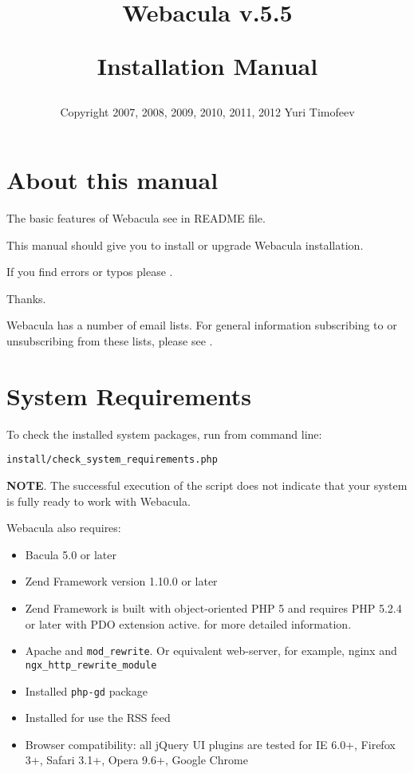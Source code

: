 \documentclass[10pt]{article}
\title{
  \Huge{Webacula v.5.5}
  \begin{center}
   \large{Installation Manual}
  \end{center}
}
\author{
  \begin{small}
    Copyright 2007, 2008, 2009, 2010, 2011, 2012
    Yuri Timofeev \htmladdnormallink{tim4dev@gmail.com}{mailto:tim4dev@gmail.com}
  \end{small}
}
\begin{document}
\maketitle
\clearpage

\tableofcontents
\clearpage

\listoffigures
\clearpage

\section{About this manual}
\label{About}

The basic features of Webacula see in README file.

This manual should give you to install or upgrade Webacula installation.

If you find errors or typos please
.

Thanks.

Webacula has a number of email lists.
For general information subscribing to or unsubscribing from these lists, please see 
.



\section{System Requirements}
\label{System Requirements}

To check the installed system packages, run from command line:
\begin{verbatim}install/check_system_requirements.php\end{verbatim}

\textbf{NOTE}. The successful execution of the script does not indicate that your system is fully ready to work with Webacula.


Webacula also requires:
\begin{itemize}
  \item Bacula 5.0 or later
  \item Zend Framework version 1.10.0 or later
  \item Zend Framework is built with object-oriented PHP 5 and requires PHP 5.2.4 or later with PDO extension active.
        for more detailed information.
  \item Apache and \texttt{mod\_rewrite}. Or equivalent web-server, for example, nginx and \texttt{ngx\_http\_rewrite\_module}
  \item Installed \texttt{php-gd} package
  \item Installed  for use the RSS feed
  \item Browser compatibility: all jQuery UI plugins are tested for IE 6.0+, Firefox 3+, Safari 3.1+, Opera 9.6+, Google Chrome
\end{itemize}
\end{document}
